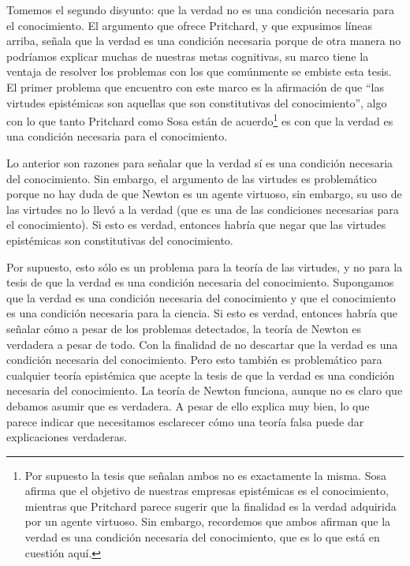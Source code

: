 \documentclass[12pt]{article}
\begin{document}
Tomemos el segundo disyunto: que la verdad no es una condición necesaria para el conocimiento. El argumento que ofrece Pritchard, y que expusimos líneas arriba, señala que la verdad es una condición necesaria porque de otra manera no podríamos explicar muchas de nuestras metas cognitivas, su marco tiene la ventaja de resolver los problemas con los que comúnmente se embiste esta tesis. El primer problema que encuentro con este marco es la afirmación de que ``las virtudes epistémicas son aquellas que son constitutivas del conocimiento'', algo con lo que tanto Pritchard como Sosa están de acuerdo\footnote{Por supuesto la tesis que señalan ambos no es exactamente la misma. Sosa afirma que el objetivo de nuestras empresas epistémicas es el conocimiento, mientras que Pritchard parece sugerir que la finalidad es la verdad adquirida por un agente virtuoso. Sin embargo, recordemos que ambos afirman que la verdad es una condición necesaria del conocimiento, que es lo que está en cuestión aquí. } es con que la verdad es una condición necesaria para el conocimiento.

Lo anterior son razones para señalar que la verdad sí es una condición necesaria del conocimiento. Sin embargo, el argumento de las virtudes es problemático porque no  hay duda de que Newton es un agente virtuoso, sin embargo, su uso de las virtudes no lo llevó a la verdad (que es una de las condiciones necesarias para el conocimiento). Si esto es verdad, entonces habría que negar que las virtudes epistémicas son constitutivas del conocimiento.


Por supuesto, esto sólo es un problema para la teoría de las virtudes, y no para la tesis de que la verdad es una condición necesaria del conocimiento. Supongamos que la verdad es una condición necesaria del conocimiento y que el conocimiento es una condición necesaria para la ciencia. Si esto es verdad, entonces habría que señalar cómo a pesar de los problemas detectados, la teoría de Newton es verdadera a pesar de todo. Con la finalidad de no descartar que la verdad es una condición necesaria del conocimiento. Pero esto también es problemático para cualquier teoría epistémica que acepte la tesis de que la verdad es una condición necesaria del conocimiento. La teoría de Newton funciona, aunque no es claro que debamos asumir que es verdadera. A pesar de ello explica muy bien, lo que parece indicar que necesitamos esclarecer cómo una teoría falsa puede dar explicaciones verdaderas.
\end{document}
